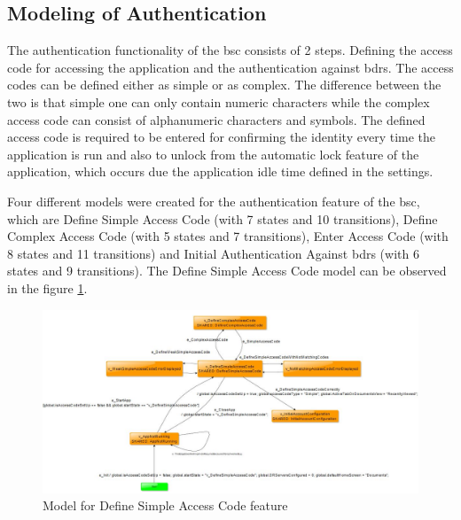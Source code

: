 \subsection{Modeling of Authentication}
\par
The authentication functionality of the \acrshort{bsc} consists of 2 steps. Defining the access code for accessing the application and the authentication against \acrshort{bdrs}. The access codes can be defined either as simple or as complex. The difference between the two is that simple one can only contain numeric characters while the complex access code can consist of alphanumeric characters and symbols. The defined access code is required to be entered for confirming the identity every time the application is run and also to unlock from the automatic lock feature of the application, which occurs due the application idle time defined in the settings.

\par
Four different models were created for the authentication feature of the \acrshort{bsc}, which are Define Simple Access Code (with 7 states and 10 transitions), Define Complex Access Code (with 5 states and 7 transitions), Enter Access Code (with 8 states and 11 transitions) and Initial Authentication Against \acrshort{bdrs} (with 6 states and 9 transitions). The Define Simple Access Code model can be observed in the figure \ref{Fig:Authentication_Model_Screenshot}.

\begin{figure} [htbp!]
	\centering
					\includegraphics[width=1\textwidth]{figures/Authentication_model_screenshot}
					\caption{\label{Fig:Authentication_Model_Screenshot} Model for Define Simple Access Code feature}
\end{figure}

